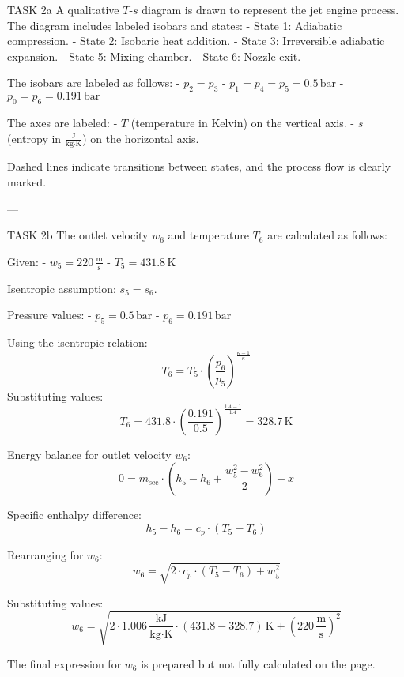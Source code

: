 TASK 2a  
A qualitative \( T \)-\( s \) diagram is drawn to represent the jet engine process. The diagram includes labeled isobars and states:  
- State 1: Adiabatic compression.  
- State 2: Isobaric heat addition.  
- State 3: Irreversible adiabatic expansion.  
- State 5: Mixing chamber.  
- State 6: Nozzle exit.  

The isobars are labeled as follows:  
- \( p_2 = p_3 \)  
- \( p_1 = p_4 = p_5 = 0.5 \, \text{bar} \)  
- \( p_0 = p_6 = 0.191 \, \text{bar} \)  

The axes are labeled:  
- \( T \) (temperature in Kelvin) on the vertical axis.  
- \( s \) (entropy in \( \frac{\text{J}}{\text{kg·K}} \)) on the horizontal axis.  

Dashed lines indicate transitions between states, and the process flow is clearly marked.  

---

TASK 2b  
The outlet velocity \( w_6 \) and temperature \( T_6 \) are calculated as follows:  

Given:  
- \( w_5 = 220 \, \frac{\text{m}}{\text{s}} \)  
- \( T_5 = 431.8 \, \text{K} \)  

Isentropic assumption: \( s_5 = s_6 \).  

Pressure values:  
- \( p_5 = 0.5 \, \text{bar} \)  
- \( p_6 = 0.191 \, \text{bar} \)  

Using the isentropic relation:  
\[
T_6 = T_5 \cdot \left( \frac{p_6}{p_5} \right)^{\frac{\kappa - 1}{\kappa}}
\]  
Substituting values:  
\[
T_6 = 431.8 \cdot \left( \frac{0.191}{0.5} \right)^{\frac{1.4 - 1}{1.4}} = 328.7 \, \text{K}
\]  

Energy balance for outlet velocity \( w_6 \):  
\[
0 = \dot{m}_{\text{sec}} \cdot \left( h_5 - h_6 + \frac{w_5^2 - w_6^2}{2} \right) + x
\]  

Specific enthalpy difference:  
\[
h_5 - h_6 = c_p \cdot (T_5 - T_6)
\]  

Rearranging for \( w_6 \):  
\[
w_6 = \sqrt{2 \cdot c_p \cdot (T_5 - T_6) + w_5^2}
\]  

Substituting values:  
\[
w_6 = \sqrt{2 \cdot 1.006 \, \frac{\text{kJ}}{\text{kg·K}} \cdot (431.8 - 328.7) \, \text{K} + (220 \, \frac{\text{m}}{\text{s}})^2}
\]  

The final expression for \( w_6 \) is prepared but not fully calculated on the page.